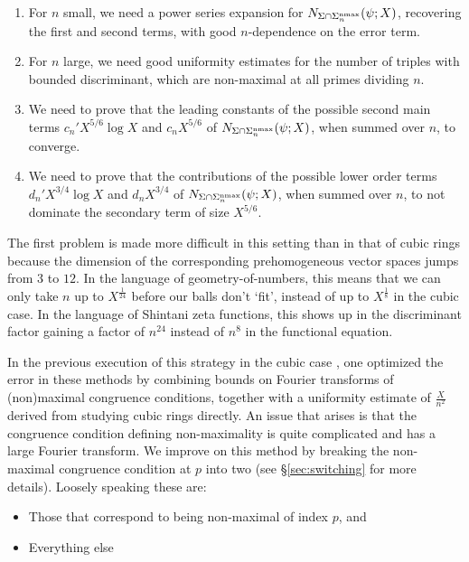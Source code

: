 \documentclass{article}
\begin{document}
\begin{enumerate}
    \item For $n$ small, we need a power series expansion for $N_{\Sigma\cap \Sigma_n^{\rm nmax}}(\psi;X)$, recovering the first and second terms, with good $n$-dependence on the error term.
    \item For $n$ large, we need good uniformity estimates for the number of triples with bounded discriminant, which are non-maximal at all primes dividing $n$.
    \item We need to prove that the leading constants of the possible second main terms $c_n'X^{5/6}\log X$ and $c_nX^{5/6}$ of $N_{\Sigma\cap \Sigma_n^{\rm nmax}}(\psi;X)$, when summed over $n$, to converge.
    \item We need to prove that the contributions of the possible lower order terms $d_n'X^{3/4}\log X$ and $d_nX^{3/4}$ of $N_{\Sigma\cap \Sigma_n^{\rm nmax}}(\psi;X)$, when summed over $n$, to not dominate the secondary term of size $X^{5/6}$.
\end{enumerate}
The first problem is made more difficult in this setting than in that of cubic rings because the dimension of the corresponding prehomogeneous vector spaces jumps from $3$ to $12$. In the language of geometry-of-numbers, this means that we can only take $n$ up to $X^{\frac1{24}}$ before our balls don't `fit', instead of up to $X^{\frac1{8}}$ in the cubic case. In the language of Shintani zeta functions, this shows up in the discriminant factor gaining a factor of $n^{24}$ instead of $n^8$ in the functional equation. 

In the previous execution of this strategy in the cubic case \cite{BST,MR3127806}, one optimized the error in these methods by combining bounds on Fourier transforms of (non)maximal congruence conditions, together with a uniformity estimate of $\frac{X}{n^2}$ derived from studying cubic rings directly. An issue that arises is that the congruence condition defining non-maximality is quite complicated and has a large Fourier transform. We improve on this method by breaking the non-maximal congruence condition at $p$ into two (see \S\ref{sec:switching} for more details). Loosely speaking these are:

\begin{itemize}
    \item Those that correspond to being non-maximal of index $p$, and
    \item Everything else
\end{itemize}
\end{document}
